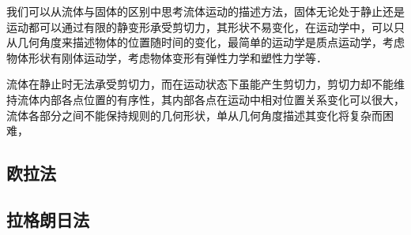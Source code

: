 
我们可以从流体与固体的区别中思考流体运动的描述方法，固体无论处于静止还是运动都可以通过有限的静变形承受剪切力，其形状不易变化，在运动学中，可以只从几何角度来描述物体的位置随时间的变化，最简单的运动学是质点运动学，考虑物体形状有刚体运动学，考虑物体变形有弹性力学和塑性力学等．

流体在静止时无法承受剪切力，而在运动状态下虽能产生剪切力，剪切力却不能维持流体内部各点位置的有序性，其内部各点在运动中相对位置关系变化可以很大，流体各部分之间不能保持规则的几何形状，单从几何角度描述其变化将复杂而困难，

\subsection{欧拉法}

\subsection{拉格朗日法}